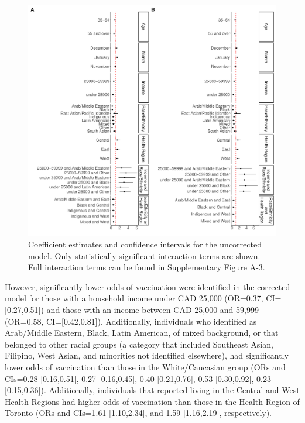 \documentclass[
  letterpaper,
  DIV=11,
  numbers=noendperiod]{scrartcl}
\begin{document}
\begin{figure}

\includegraphics{main_files/figure-pdf/fig-models-1.pdf} \hfill{}

\caption{\label{fig-models}Coefficient estimates and confidence
intervals for the uncorrected model. Only statistically significant
interaction terms are shown. Full interaction terms can be found in
Supplementary Figure A-3.}

\end{figure}

However, significantly lower odds of vaccination were identified in the
corrected model for those with a household income under CAD 25,000
(OR=0.37, CI={[}0.27,0.51{]}) and those with an income between CAD
25,000 and 59,999 (OR=0.58, CI={[}0.42,0.81{]}). Additionally,
individuals who identified as Arab/Middle Eastern, Black, Latin
American, of mixed background, or that belonged to other racial groups
(a category that included Southeast Asian, Filipino, West Asian, and
minorities not identified elsewhere), had significantly lower odds of
vaccination than those in the White/Caucasian group (ORs and CIs=0.28
{[}0.16,0.51{]}, 0.27 {[}0.16,0.45{]}, 0.40 {[}0.21,0.76{]}, 0.53
{[}0.30,0.92{]}, 0.23 {[}0.15,0.36{]}). Additionally, individuals that
reported living in the Central and West Health Regions had higher odds
of vaccination than those in the Health Region of Toronto (ORs and
CIs=1.61 {[}1.10,2.34{]}, and 1.59 {[}1.16,2.19{]}, respectively).
\end{document}
